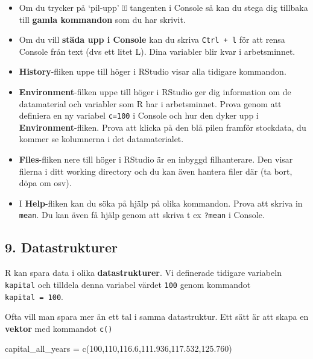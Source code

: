 \documentclass[
  letterpaper,
  DIV=11,
  numbers=noendperiod,
  oneside]{scrartcl}
\newenvironment{Shaded}{\begin{snugshade}}{\end{snugshade}}
\newcommand{\DecValTok}[1]{\textcolor[rgb]{0.68,0.00,0.00}{#1}}
\newcommand{\FloatTok}[1]{\textcolor[rgb]{0.68,0.00,0.00}{#1}}
\newcommand{\FunctionTok}[1]{\textcolor[rgb]{0.28,0.35,0.67}{#1}}
\newcommand{\NormalTok}[1]{\textcolor[rgb]{0.00,0.23,0.31}{#1}}
\newcommand{\OtherTok}[1]{\textcolor[rgb]{0.00,0.23,0.31}{#1}}
\providecommand{\tightlist}{%
  \setlength{\itemsep}{0pt}\setlength{\parskip}{0pt}}\usepackage{longtable,booktabs,array}
\begin{document}
\begin{itemize}
\tightlist
\item
  Om du trycker på `pil-upp' ⍐ tangenten i Console så kan du stega dig
  tillbaka till \textbf{gamla kommandon} som du har skrivit.
\item
  Om du vill \textbf{städa upp i Console} kan du skriva
  \texttt{Ctrl\ +\ l} för att rensa Console från text (dvs ett litet L).
  Dina variabler blir kvar i arbetsminnet.
\item
  \textbf{History}-fliken uppe till höger i RStudio visar alla tidigare
  kommandon.
\item
  \textbf{Environment}-filken uppe till höger i RStudio ger dig
  information om de datamaterial och variabler som R har i arbetsminnet.
  Prova genom att definiera en ny variabel \texttt{c=100} i Console och
  hur den dyker upp i \textbf{Environment}-fliken. Prova att klicka på
  den blå pilen framför stockdata, du kommer se kolumnerna i det
  datamaterialet.
\item
  \textbf{Files}-fliken nere till höger i RStudio är en inbyggd
  filhanterare. Den visar filerna i ditt working directory och du kan
  även hantera filer där (ta bort, döpa om osv).
\item
  I \textbf{Help}-fliken kan du söka på hjälp på olika kommandon. Prova
  att skriva in \texttt{mean}. Du kan även få hjälp genom att skriva t
  ex \texttt{?mean} i Console.
\end{itemize}

\hypertarget{datastrukturer}{%
\subsection{9. Datastrukturer}\label{datastrukturer}}

R kan spara data i olika \textbf{datastrukturer}. Vi definerade tidigare
variabeln \texttt{kapital} och tilldela denna variabel värdet
\texttt{100} genom kommandot \texttt{kapital\ =\ 100}.

Ofta vill man spara mer än ett tal i samma datastruktur. Ett sätt är att
skapa en \textbf{vektor} med kommandot \texttt{c()}

\begin{Shaded}
\begin{Highlighting}[]
\NormalTok{capital\_all\_years }\OtherTok{=} \FunctionTok{c}\NormalTok{(}\DecValTok{100}\NormalTok{,}\DecValTok{110}\NormalTok{,}\FloatTok{116.6}\NormalTok{,}\FloatTok{111.936}\NormalTok{,}\FloatTok{117.532}\NormalTok{,}\FloatTok{125.760}\NormalTok{)}
\end{Highlighting}
\end{Shaded}
\end{document}

